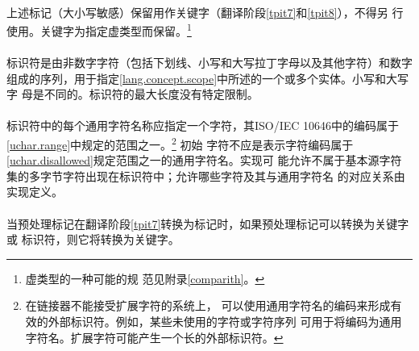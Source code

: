 {\paragraph{}
上述标记（大小写敏感）保留用作关键字（翻译阶段\ref{tpit7}和\ref{tpit8}），不得另
行使用。关键字为指定虚类型而保留。\footnote{虚类型的一种可能的规
范见附录\ref{comparith}。}

\syntax
\paragraph{}

\semantic
\paragraph{}
标识符是由非数字字符（包括下划线\tm{\_}、小写和大写拉丁字母以及其他字符）和数字
组成的序列，用于指定\ref{lang.concept.scope}中所述的一个或多个实体。小写和大写字
母是不同的。标识符的最大长度没有特定限制。

\paragraph{}
标识符中的每个通用字符名称应指定一个字符，其ISO/IEC 10646中的编码属于
\ref{uchar.range}中规定的范围之一。\footnote{在链接器不能接受扩展字符的系统上，
可以使用通用字符名的编码来形成有效的外部标识符。例如，某些未使用的字符或字符序列
可用于将编码为通用字符名。扩展字符可能产生一个长的外部标识符。} 初始
字符不应是表示字符编码属于\ref{uchar.disallowed}规定范围之一的通用字符名。实现可
能允许不属于基本源字符集的多字节字符出现在标识符中；允许哪些字符及其与通用字符名
的对应关系由实现定义。

\paragraph{}
当预处理标记在翻译阶段\ref{tpit7}转换为标记时，如果预处理标记可以转换为关键字或
标识符，则它将转换为关键字。

}
